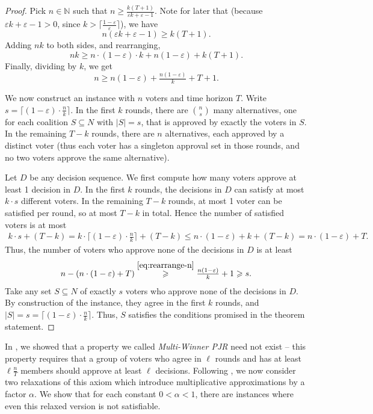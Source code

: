 \documentclass[10pt]{scrartcl}
\theoremstyle{plain}
\theoremstyle{definition}
\renewcommand*{\le}{\leqslant}
\renewcommand*{\ge}{\geqslant}
\renewcommand*{\geq}{\geqslant}
\renewcommand{\epsilon}{\varepsilon}
\begin{document}
\CounterexampleConstruction*
\begin{proof}
	Pick $n \in \mathbb N$ such that $n \geq \frac{k(T+1)}{\epsilon k + \epsilon - 1}$. Note for later that (because $\epsilon k + \epsilon - 1 > 0$, since $k > \lceil \frac{1-\epsilon}{\epsilon} \rceil$), we have
	\[
	n(\epsilon k + \epsilon - 1) \geq k(T+1).
	\]
	Adding $nk$ to both sides, and rearranging,
	\[
	nk \geq n \cdot (1-\epsilon) \cdot k + n(1 - \epsilon) + k(T+1).
	\]
	Finally, dividing by $k$, we get
	\begin{equation}
		\label{eq:rearrange-n}
		n \geq n(1 - \epsilon) + \tfrac{n(1 - \epsilon)}{k} + T + 1.
	\end{equation}
	
	We now construct an instance with $n$ voters and time horizon $T$. Write $s = \lceil (1 - \epsilon) \cdot \frac{n}{k} \rceil$. In the first $k$ rounds, there are $\binom{n}{s}$ many alternatives, one for each coalition $S \subseteq N$ with $|S| = s$, that is approved by exactly the voters in $S$. In the remaining $T - k$ rounds, there are $n$ alternatives, each approved by a distinct voter (thus each voter has a singleton approval set in those rounds, and no two voters approve the same alternative).
	
	Let $D$ be any decision sequence. We first compute how many voters approve at least 1 decision in $D$. In the first $k$ rounds, the decisions in $D$ can satisfy at most $k \cdot s$ different voters. In the remaining $T - k$ rounds, at most 1 voter can be satisfied per round, so at most $T - k$ in total. Hence the number of satisfied voters is at most
	\begin{align*}
		k \cdot s + (T - k) = k \cdot \lceil (1 - \epsilon) \cdot \tfrac{n}{k} \rceil + (T - k) \le n \cdot (1 - \epsilon) + k + (T - k) = n \cdot (1 - \epsilon) + T.
	\end{align*}
	Thus, the number of voters who approve none of the decisions in $D$ is at least
	\[
	n - (n \cdot (1-\epsilon) + T) \overset{\eqref{eq:rearrange-n}}{\ge} \tfrac{n(1 - \epsilon)}{k} + 1 \ge s.
	\]
	Take any set $S \subseteq N$ of exactly $s$ voters who approve none of the decisions in $D$. By construction of the instance, they agree in the first $k$ rounds, and $|S| = s = \lceil (1 - \epsilon) \cdot \frac{n}{k} \rceil$. Thus, $S$ satisfies the conditions promised in the theorem statement.
\end{proof}

In , we showed that a property we called \emph{Multi-Winner PJR} need not exist -- this property requires that a group of voters who agree in $\ell$ rounds and has at least $\ell \frac{n}{T}$ members should approve at least $\ell$ decisions. Following \citet{DoHL022}, we now consider two relaxations of this axiom which introduce multiplicative approximations by a factor $\alpha$. We show that for each constant $0 < \alpha < 1$, there are instances where even this relaxed version is not satisfiable. 
\end{document}
